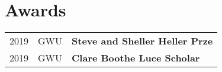 \documentclass[]{deedy-resume-openfont}
\begin{document}
\begin{minipage}[t]{0.66\textwidth}



\section{Awards} 
\begin{tabular}{rll}
        2019 & GWU & {\bf Steve and Sheller Heller Prze} \\ 
        2019 & GWU & {\bf Clare Boothe Luce Scholar} \\
\end{tabular}


\end{minipage}
\end{document}
